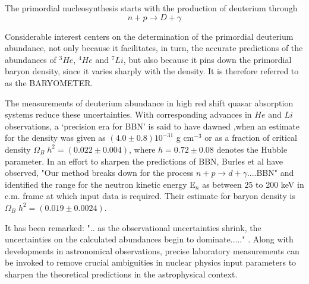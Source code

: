 The primordial nucleosynthesis starts with the production of deuterium through
$$
n+p \to D+ \gamma
$$

Considerable interest centers on the determination of the primordial deuterium abundance, not only because it facilitates, in turn, the accurate predictions of the abundances of $^3He$, $^4He$ and $^7Li$, but also because it pins down the primordial baryon density, since it varies sharply with  the density. It is therefore referred to as the BARYOMETER.

The measurements of deuterium abundance in high red shift quasar absorption systems \cite{key15} reduce these uncertainties. With corresponding advances in $He$ and $Li$ observations, a `precision era for BBN' is said to have dawned \cite{key16},when an estimate for the density was given as $(4.0 \pm 0.8) 10^{-31}$ g cm$^{-3}$ or as a fraction of critical density $\Omega_B \;h^{2} = (0.022\pm 0.004)$, where $h=0.72\pm 0.08$ denotes the Hubble parameter.   In an effort to sharpen the predictions of BBN, Burles et al \cite{key17} have observed,
"Our method breaks down for the process $n + p \to d+\gamma$....BBN" and identified the 
range for the neutron kinetic energy E$_n$ as between 25 to 200 keV in c.m. frame at 
which input data is required. Their estimate for baryon density  is 
$\Omega_B \;h^{2} = (0.019\pm 0.0024)$. 

It has been remarked:
".. as the observational uncertainties shrink, the uncertainties on the  calculated 
abundances begin to dominate....." \cite {KMN2000}. Along with  developments 
in astronomical observations, precise laboratory measurements can be invoked to remove 
crucial ambiguities in nuclear  physics input parameters to sharpen the theoretical 
predictions in the astrophysical context. 


